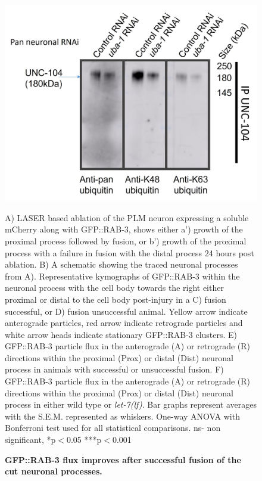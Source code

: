\begin{appendices}
	\begin{figure}
	\centering
	\includegraphics[width=1\linewidth]{figs/example}
	\caption[GFP::RAB-3 flux improves after successful fusion of the cut neuronal processes.]{\textbf{GFP::RAB-3 flux improves after successful fusion of the cut neuronal processes.}} \raggedright \small A) LASER based ablation of the PLM neuron expressing a soluble mCherry along with GFP::RAB-3, shows either a') growth of the proximal process followed by fusion, or b') growth of the proximal process with a failure in fusion with the distal process 24 hours post ablation. B) A schematic showing the traced neuronal processes from A). Representative kymographs of GFP::RAB-3 within the neuronal process with the cell body towards the right either proximal or distal to the cell body post-injury in a C) fusion successful, or D) fusion unsuccessful animal. Yellow arrow indicate anterograde particles, red arrow indicate retrograde particles and white arrow heads indicate stationary GFP::RAB-3 clusters. E) GFP::RAB-3 particle flux in the anterograde (A) or retrograde (R) directions within the proximal (Prox) or distal (Dist) neuronal process in animals with successful or unsuccessful fusion. F) GFP::RAB-3 particle flux in the anterograde (A) or retrograde (R) directions within the proximal (Prox) or distal (Dist) neuronal process in either wild type or \textit{let-7(lf)}. Bar graphs represent averages with the S.E.M. represented as whiskers. One-way ANOVA with Bonferroni test used for all statistical comparisons. ns- non significant, *p$<$0.05 ***p$<$0.001
	\label{fig:Atrayeerab}
\end{figure}


\end{appendices}
